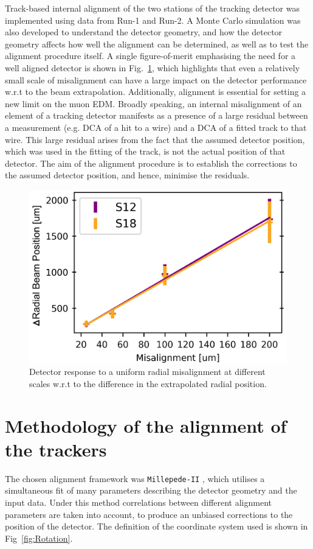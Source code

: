 \documentclass[12pt]{article}
\begin{document}
Track-based internal alignment of the two stations of the tracking detector was implemented using data from Run-1 and Run-2. A Monte Carlo simulation was also developed to understand the detector geometry, and how the detector geometry affects how well the alignment can be determined, as well as to test the alignment procedure itself. A single figure-of-merit emphasising the need for a well aligned detector is shown in Fig.~\ref{fig:rad_inter}, which highlights that even a relatively small scale of misalignment can have a large impact on the detector performance w.r.t to the beam extrapolation. Additionally, alignment is essential for setting a new limit on the muon EDM. Broadly speaking, an internal misalignment of an element of a tracking detector manifests as a presence of a large residual between a measurement (e.g. DCA of a hit to a wire) and a DCA of a fitted track to that wire. This large residual arises from the fact that the assumed detector position, which was used in the fitting of the track, is not the actual position of that detector. The aim of the alignment procedure is to establish the corrections to the assumed detector position, and hence, minimise the residuals.

\begin{figure}[h!]
\centering
\includegraphics[width=0.6\linewidth]{fig/internal_rad.png}
\caption{Detector response to a uniform radial misalignment at different scales w.r.t to the difference in the extrapolated radial position.}
\label{fig:rad_inter}
\end{figure}

\section{Methodology of the alignment of the trackers}
The chosen alignment framework was \texttt{Millepede-II} \cite{mp2}, which utilises a simultaneous fit of many parameters describing the detector geometry and the input data. Under this method correlations between different alignment parameters are taken into account, to produce an unbiased corrections to the position of the detector. The definition of the coordinate system used is shown in Fig~\ref{fig:Rotation}.
\end{document}
